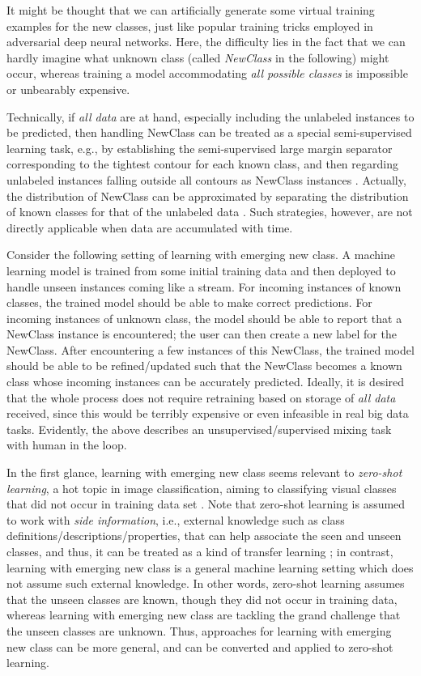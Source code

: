 \documentclass[review,11pt]{ReportTemplate}
\begin{document}
It might be thought that we can artificially generate some virtual training examples for the new classes, just like popular training tricks employed in adversarial deep neural networks. Here, the difficulty lies in the fact that we can hardly imagine what unknown class (called \textit{NewClass} in the following) might occur, whereas training a model accommodating \textit{all possible classes} is impossible or unbearably expensive.

Technically, if \textit{all data} are at hand, especially including the unlabeled instances to be predicted, then handling NewClass can be treated as a special semi-supervised learning \cite{Zhou2018} task, e.g., by establishing the semi-supervised large margin separator corresponding to the tightest contour for each known class, and then regarding unlabeled instances falling outside all contours as NewClass instances \cite{Da:Yu:Zhou2014}. Actually, the distribution of NewClass can be approximated by separating the distribution of known classes for that of the unlabeled data \cite{Zhang:Zhao:Ma:Zhou2020}. Such strategies, however, are not directly applicable when data are accumulated with time.

Consider the following setting of learning with emerging new class. A machine learning model is trained from some initial training data and then deployed to handle unseen instances coming like a stream. For incoming instances of known classes, the trained model should be able to make correct predictions. For incoming instances of unknown class, the model should be able to report that a NewClass instance is encountered; the user can then create a new label for the NewClass. After encountering a few instances of this NewClass, the trained model should be able to be refined/updated such that the NewClass becomes a known class whose incoming instances can be accurately predicted. Ideally, it is desired that the whole process does not require retraining based on storage of \textit{all data} received, since this would be terribly expensive or even infeasible in real big data tasks. Evidently, the above describes an unsupervised/supervised mixing task with human in the loop.

In the first glance, learning with emerging new class seems relevant to \textit{zero-shot learning}, a hot topic in image classification, aiming to classifying visual classes that did not occur in training data set \cite{Socher:Ganjoo:Manning:Ng2013,Xian:Lampert:Schiele:Akata2019,Chen:Geng:Chen:Horrocks2021}. Note that zero-shot learning is assumed to work with \textit{side information}, i.e., external knowledge such as class definitions/descriptions/properties, that can help associate the seen and unseen classes, and thus, it can be treated as a kind of transfer learning \cite{Pan:Yang2009}; in contrast, learning with emerging new class is a general machine learning setting which does not assume such external knowledge. In other words, zero-shot learning assumes that the unseen classes are known, though they did not occur in training data, whereas learning with emerging new class are tackling the grand challenge that the unseen classes are unknown. Thus, approaches for learning with emerging new class can be more general, and can be converted and applied to zero-shot learning.
\end{document}
